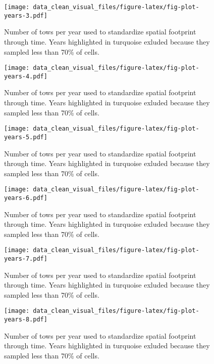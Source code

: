 \documentclass[
]{article}
\begin{document}
\begin{figure}
\centering
\texttt{[image: data\_clean\_visual\_files/figure-latex/fig-plot-years-3.pdf]}
\caption{\label{fig:fig-plot-years-3}Number of tows per year used to standardize spatial footprint through time. Years highlighted in turquoise exluded because they sampled less than 70\% of cells.}
\end{figure}

\begin{figure}
\centering
\texttt{[image: data\_clean\_visual\_files/figure-latex/fig-plot-years-4.pdf]}
\caption{\label{fig:fig-plot-years-4}Number of tows per year used to standardize spatial footprint through time. Years highlighted in turquoise exluded because they sampled less than 70\% of cells.}
\end{figure}

\begin{figure}
\centering
\texttt{[image: data\_clean\_visual\_files/figure-latex/fig-plot-years-5.pdf]}
\caption{\label{fig:fig-plot-years-5}Number of tows per year used to standardize spatial footprint through time. Years highlighted in turquoise exluded because they sampled less than 70\% of cells.}
\end{figure}

\begin{figure}
\centering
\texttt{[image: data\_clean\_visual\_files/figure-latex/fig-plot-years-6.pdf]}
\caption{\label{fig:fig-plot-years-6}Number of tows per year used to standardize spatial footprint through time. Years highlighted in turquoise exluded because they sampled less than 70\% of cells.}
\end{figure}

\begin{figure}
\centering
\texttt{[image: data\_clean\_visual\_files/figure-latex/fig-plot-years-7.pdf]}
\caption{\label{fig:fig-plot-years-7}Number of tows per year used to standardize spatial footprint through time. Years highlighted in turquoise exluded because they sampled less than 70\% of cells.}
\end{figure}

\begin{figure}
\centering
\texttt{[image: data\_clean\_visual\_files/figure-latex/fig-plot-years-8.pdf]}
\caption{\label{fig:fig-plot-years-8}Number of tows per year used to standardize spatial footprint through time. Years highlighted in turquoise exluded because they sampled less than 70\% of cells.}
\end{figure}
\end{document}
